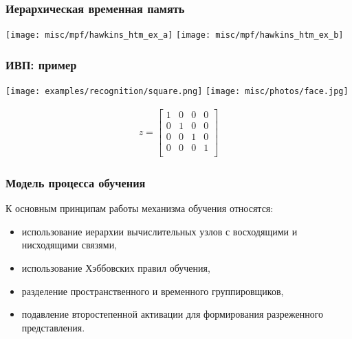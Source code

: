\documentclass[12pt]{beamer}
\begin{document}
	\begin{frame}
		\frametitle{Иерархическая временная память}
		
		\begin{center}
		\texttt{[image: misc/mpf/hawkins\_htm\_ex\_a]}
		\texttt{[image: misc/mpf/hawkins\_htm\_ex\_b]}
		\end{center}

	\end{frame}
	
	\begin{frame}
		\frametitle{ИВП: пример}
		
		\begin{center}
			\texttt{[image: examples/recognition/square.png]}
			\texttt{[image: misc/photos/face.jpg]}
		\end{center}
		\begin{align*}
		z=\left[\begin{array}{cccc}
		1 & 0 & 0 & 0 \\ 
		0 & 1 & 0 & 0\\ 
		0 & 0 & 1  & 0\\
		0 & 0 & 0  & 1\\
		\end{array}\right]
		\end{align*}
	\end{frame}

	\begin{frame}
		\frametitle{Модель процесса обучения}
		
		К основным принципам работы механизма обучения относятся: 
		
		\begin{itemize}
			\item использование иерархии вычислительных узлов с восходящими и нисходящими связями, 
			\item использование Хэббовских правил обучения, 
			\item разделение пространственного и временного группировщиков, 
			\item подавление второстепенной активации для формирования разреженного представления.
		\end{itemize}
		
	\end{frame}	
	
\end{document}

